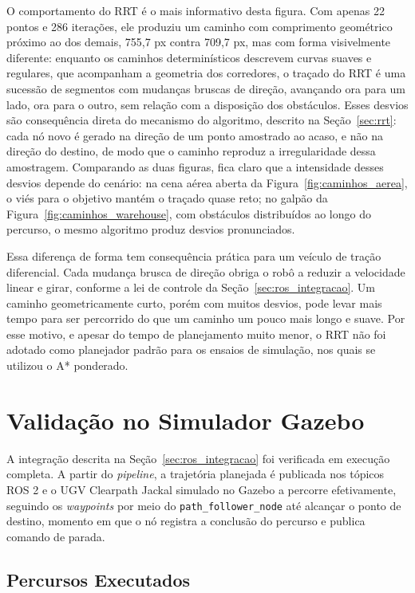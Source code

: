 \documentclass[
    12pt,
    openright,
    oneside,
    a4paper,
    english,
    brazil
]{abntex2}
\begin{document}
O comportamento do RRT é o mais informativo desta figura. Com apenas 22 pontos e 286 iterações, ele produziu um caminho com comprimento geométrico próximo ao dos demais, 755,7 px contra 709,7 px, mas com forma visivelmente diferente: enquanto os caminhos determinísticos descrevem curvas suaves e regulares, que acompanham a geometria dos corredores, o traçado do RRT é uma sucessão de segmentos com mudanças bruscas de direção, avançando ora para um lado, ora para o outro, sem relação com a disposição dos obstáculos. Esses desvios são consequência direta do mecanismo do algoritmo, descrito na Seção~\ref{sec:rrt}: cada nó novo é gerado na direção de um ponto amostrado ao acaso, e não na direção do destino, de modo que o caminho reproduz a irregularidade dessa amostragem. Comparando as duas figuras, fica claro que a intensidade desses desvios depende do cenário: na cena aérea aberta da Figura~\ref{fig:caminhos_aerea}, o viés para o objetivo mantém o traçado quase reto; no galpão da Figura~\ref{fig:caminhos_warehouse}, com obstáculos distribuídos ao longo do percurso, o mesmo algoritmo produz desvios pronunciados.

Essa diferença de forma tem consequência prática para um veículo de tração diferencial. Cada mudança brusca de direção obriga o robô a reduzir a velocidade linear e girar, conforme a lei de controle da Seção~\ref{sec:ros_integracao}. Um caminho geometricamente curto, porém com muitos desvios, pode levar mais tempo para ser percorrido do que um caminho um pouco mais longo e suave. Por esse motivo, e apesar do tempo de planejamento muito menor, o RRT não foi adotado como planejador padrão para os ensaios de simulação, nos quais se utilizou o A* ponderado.

\section{Validação no Simulador Gazebo}
\label{sec:res_gazebo}

A integração descrita na Seção~\ref{sec:ros_integracao} foi verificada em execução completa. A partir do \textit{pipeline}, a trajetória planejada é publicada nos tópicos ROS 2 e o UGV Clearpath Jackal simulado no Gazebo a percorre efetivamente, seguindo os \textit{waypoints} por meio do \texttt{path\_follower\_node} até alcançar o ponto de destino, momento em que o nó registra a conclusão do percurso e publica comando de parada.

\subsection{Percursos Executados}
\end{document}
